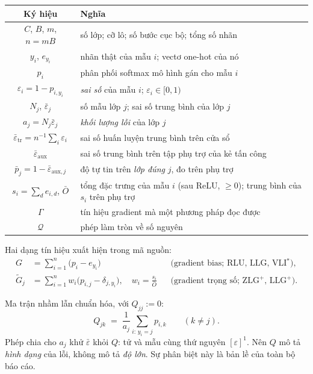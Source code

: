 \documentclass[11pt,a4paper]{article}
\theoremstyle{remark}
\newcommand{\quant}{\mathcal{Q}}
\newcommand{\epstr}{\bar\varepsilon_{\mathrm{tr}}}
\newcommand{\epsaux}{\bar\varepsilon_{\mathrm{aux}}}
\begin{document}
\begin{center}
\begin{tabular}{@{}cl@{}}
\toprule
\textbf{Ký hiệu} & \textbf{Nghĩa} \\
\midrule
$C$, $B$, $m$, $n=mB$ & số lớp; cỡ lô; số bước cục bộ; tổng số nhãn \\
$y_i$, $e_{y_i}$ & nhãn thật của mẫu $i$; vectơ one-hot của nó \\
$p_i$ & phân phối softmax mô hình gán cho mẫu $i$ \\
$\varepsilon_i = 1-p_{i,y_i}$ & \emph{sai số} của mẫu $i$; $\varepsilon_i\in[0,1)$ \\
$N_j$, $\bar\varepsilon_j$ & số mẫu lớp $j$; sai số trung bình của lớp $j$ \\
$a_j = N_j\bar\varepsilon_j$ & \emph{khối lượng lỗi} của lớp $j$ \\
$\epstr = n^{-1}\sum_i\varepsilon_i$ & sai số huấn luyện trung bình trên cửa sổ \\
$\epsaux$ & sai số trung bình trên tập phụ trợ của kẻ tấn công \\
$\bar p_j = 1-\bar\varepsilon_{\mathrm{aux},j}$ & độ tự tin trên \emph{lớp đúng} $j$, đo trên phụ trợ \\
$s_i = \sum_d e_{i,d}$, $\bar O$ & tổng đặc trưng của mẫu $i$ (sau ReLU, $\ge 0$); trung bình của $s_i$ trên phụ trợ \\
$\Gamma$ & tín hiệu gradient mà một phương pháp đọc được \\
$\quant$ & phép làm tròn về số nguyên \\
\bottomrule
\end{tabular}
\end{center}

Hai dạng tín hiệu xuất hiện trong mã nguồn:
\begin{align}
G &= \sum_{i=1}^{n}\bigl(p_i-e_{y_i}\bigr) && \text{(gradient bias; RLU, LLG, VLI$^*$)},
\label{eq:G}\\
\tilde G_j &= \sum_{i=1}^{n} w_i\bigl(p_{i,j}-\delta_{j,y_i}\bigr),
 \quad w_i=\frac{s_i}{\bar O} && \text{(gradient trọng số; ZLG$^+$, LLG$^+$)}.
\label{eq:Gtilde}
\end{align}

Ma trận nhầm lẫn chuẩn hóa, với $Q_{jj}:=0$:
\begin{equation}
Q_{jk} \;=\; \frac{1}{a_j}\sum_{i:\,y_i=j} p_{i,k}\qquad (k\neq j).
\label{eq:Q}
\end{equation}
Phép chia cho $a_j$ khử $\bar\varepsilon$ khỏi $Q$: tử và mẫu cùng thứ nguyên
$[\varepsilon]^1$. Nên $Q$ mô tả \emph{hình dạng} của lỗi, không mô tả
\emph{độ lớn}. Sự phân biệt này là bản lề của toàn bộ báo cáo.
\end{document}
